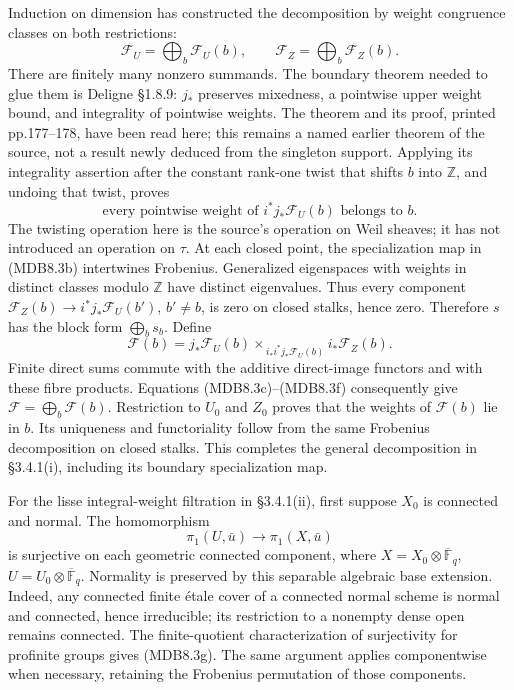 \documentclass[
]{report}
\newcounter{none} %
\begin{document}
Induction on dimension has constructed the decomposition by weight
congruence classes on both restrictions: \[
\mathcal F_U=\bigoplus_b\mathcal F_U(b),\qquad
\mathcal F_Z=\bigoplus_b\mathcal F_Z(b).
\tag{MDB8.3d}
\] There are finitely many nonzero summands. The boundary theorem needed
to glue them is Deligne §1.8.9: \(j_*\) preserves mixedness, a pointwise
upper weight bound, and integrality of pointwise weights. The theorem
and its proof, printed pp.177--178, have been read here; this remains a
named earlier theorem of the source, not a result newly deduced from the
singleton support. Applying its integrality assertion after the constant
rank-one twist that shifts \(b\) into \(\mathbb Z\), and undoing that
twist, proves \[
\text{every pointwise weight of }i^*j_*\mathcal F_U(b)
\text{ belongs to }b.
\tag{MDB8.3e}
\] The twisting operation here is the source's operation on Weil
sheaves; it has not introduced an operation on \(\tau\). At each closed
point, the specialization map in (MDB8.3b) intertwines Frobenius.
Generalized eigenspaces with weights in distinct classes modulo
\(\mathbb Z\) have distinct eigenvalues. Thus every component
\(\mathcal F_Z(b)\to i^*j_*\mathcal F_U(b')\), \(b'\neq b\), is zero on
closed stalks, hence zero. Therefore \(s\) has the block form
\(\bigoplus_b s_b\). Define \[
\mathcal F(b)=
j_*\mathcal F_U(b)
\times_{\,i_*i^*j_*\mathcal F_U(b)}
i_*\mathcal F_Z(b).
\tag{MDB8.3f}
\] Finite direct sums commute with the additive direct-image functors
and with these fibre products. Equations (MDB8.3c)--(MDB8.3f)
consequently give \(\mathcal F=\bigoplus_b\mathcal F(b)\). Restriction
to \(U_0\) and \(Z_0\) proves that the weights of \(\mathcal F(b)\) lie
in \(b\). Its uniqueness and functoriality follow from the same
Frobenius decomposition on closed stalks. This completes the general
decomposition in §3.4.1(i), including its boundary specialization map.

For the lisse integral-weight filtration in §3.4.1(ii), first suppose
\(X_0\) is connected and normal. The homomorphism \[
\pi_1(U,\bar u)\longrightarrow\pi_1(X,\bar u)
\tag{MDB8.3g}
\] is surjective on each geometric connected component, where
\(X=X_0\otimes\overline{\mathbb F}_q\),
\(U=U_0\otimes\overline{\mathbb F}_q\). Normality is preserved by this
separable algebraic base extension. Indeed, any connected finite étale
cover of a connected normal scheme is normal and connected, hence
irreducible; its restriction to a nonempty dense open remains connected.
The finite-quotient characterization of surjectivity for profinite
groups gives (MDB8.3g). The same argument applies componentwise when
necessary, retaining the Frobenius permutation of those components.
\end{document}
